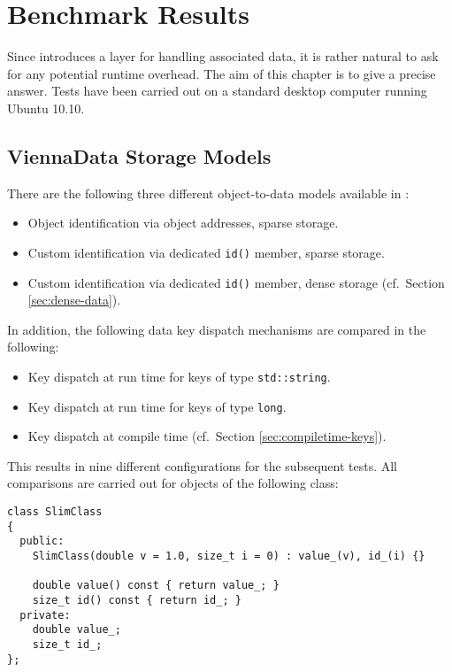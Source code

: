 \chapter{Benchmark Results} \label{chap:benchmarks}
Since {\ViennaData} introduces a layer for handling associated data, it is rather
natural to ask for any potential runtime overhead. The aim of this
chapter is to give a precise answer. Tests have been carried out on a standard desktop computer running Ubuntu 10.10.

\section{ViennaData Storage Models}
There are the following three different object-to-data models available in {\ViennaData}:
\begin{itemize}
 \item Object identification via object addresses, sparse storage.
 \item Custom identification via dedicated \lstinline|id()| member, sparse storage.
 \item Custom identification via dedicated \lstinline|id()| member, dense storage (cf.~Section \ref{sec:dense-data}).
\end{itemize}
In addition, the following data key dispatch mechanisms are compared in the following:
\begin{itemize}
 \item Key dispatch at run time for keys of type \lstinline|std::string|.
 \item Key dispatch at run time for keys of type \lstinline|long|.
 \item Key dispatch at compile time (cf.~Section \ref{sec:compiletime-keys}).
\end{itemize}
This results in nine different configurations for the subsequent tests. All comparisons are carried out for objects of the following class:
\begin{lstlisting}
class SlimClass
{
  public:
    SlimClass(double v = 1.0, size_t i = 0) : value_(v), id_(i) {}
    
    double value() const { return value_; }
    size_t id() const { return id_; }
  private:
    double value_;
    size_t id_;
};
\end{lstlisting}

